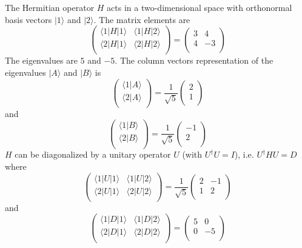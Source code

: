 \documentclass{article}
\begin{document}
The Hermitian operator \( H \) acts in a two-dimensional space with orthonormal basis vectors \( |1\rangle \) and \( |2\rangle \). The matrix elements are
\[
\begin{pmatrix}
\langle 1|H|1\rangle & \langle 1|H|2\rangle \\
\langle 2|H|1\rangle & \langle 2|H|2\rangle \\
\end{pmatrix}
=
\begin{pmatrix}
3 & 4 \\
4 & -3 \\
\end{pmatrix}
\tag{1}
\]
The eigenvalues are \( 5 \) and \( -5 \). The column vectors representation of the eigenvalues \( |A\rangle \) and \( |B\rangle \) is
\[
\begin{pmatrix}
\langle 1|A\rangle \\
\langle 2|A\rangle \\
\end{pmatrix}
= \frac{1}{\sqrt{5}}
\begin{pmatrix}
2 \\
1 \\
\end{pmatrix}
\]
and
\[
\begin{pmatrix}
\langle 1|B\rangle \\
\langle 2|B\rangle \\
\end{pmatrix}
= \frac{1}{\sqrt{5}}
\begin{pmatrix}
-1 \\
2 \\
\end{pmatrix}
\tag{2}
\]
\( H \) can be diagonalized by a unitary operator \( U \) (with \( U^\dagger U = I \)), i.e. \( U^\dagger HU = D \) where
\[
\begin{pmatrix}
\langle 1|U|1\rangle & \langle 1|U|2\rangle \\
\langle 2|U|1\rangle & \langle 2|U|2\rangle \\
\end{pmatrix}
= \frac{1}{\sqrt{5}}
\begin{pmatrix}
2 & -1 \\
1 & 2 \\
\end{pmatrix}
\tag{3}
\]
and
\[
\begin{pmatrix}
\langle 1|D|1\rangle & \langle 1|D|2\rangle \\
\langle 2|D|1\rangle & \langle 2|D|2\rangle \\
\end{pmatrix}
= 
\begin{pmatrix}
5 & 0 \\
0 & -5 \\
\end{pmatrix}
\tag{4}
\]
\end{document}
